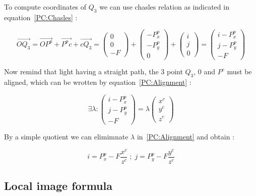 To compute coordinates of $Q_3$ we can use chasles relation as indicated in equation~\ref{PC:Chasles} :

\begin{equation}
	\overrightarrow{OQ_3} =  \overrightarrow{O P^p} + \overrightarrow{P^p c} +  \overrightarrow{c Q_3}
	 =     \begin{pmatrix} 0\\0\\-F \end{pmatrix}
             + \begin{pmatrix} -P^p_x\\-P^p_y\\0 \end{pmatrix}
             + \begin{pmatrix} i\\j\\0 \end{pmatrix}
	 =     \begin{pmatrix} i-P^p_x\\j-P^p_y\\-F \end{pmatrix}
	\label{PC:Chasles}
\end{equation}

Now remind that light having a straight path, the $3$ point $Q_3$, $0$ and $P^c$ must be aligned,
which can be wrotten by equation~\ref{PC:Alignment} :

\begin{equation}
	\exists \lambda : 
	\begin{pmatrix} i-P^p_x\\j-P^p_y\\-F \end{pmatrix} 
      = \lambda   \begin{pmatrix} x^c\\y^c\\z^c \end{pmatrix}
		\label{PC:Alignment}
\end{equation}

By a simple quotient  we can elimimnate $\lambda$ in~\ref{PC:Alignment} and obtain :


\begin{equation}
	i = P^p_x -F \frac{x^c}{z^c}  \; ; \;
	j = P^p_y -F \frac{y^c}{z^c}  
	\label{PC:FormulaImaIntr1}
\end{equation}

\subsection{Local image formula}

